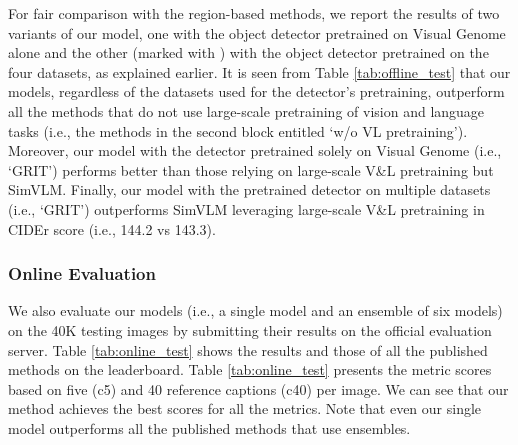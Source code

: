 \documentclass[runningheads]{llncs}
\begin{document}
For fair comparison with the region-based methods, we report the results of two variants of our model,  one with the object detector pretrained on Visual Genome alone and the other (marked with ) with the object detector pretrained on the four datasets, as explained earlier. 
It is seen from Table \ref{tab:offline_test} that our models, regardless of the datasets used for the detector's pretraining, outperform all the methods that do not use large-scale pretraining of vision and language tasks (i.e., the methods in the second block entitled `w/o VL pretraining'). Moreover, our model with the detector pretrained solely on Visual Genome (i.e., `GRIT') performs better than those relying on large-scale V\&L pretraining but SimVLM. Finally, our model with the pretrained detector on multiple datasets (i.e., `GRIT') outperforms SimVLM leveraging large-scale V\&L pretraining in CIDEr score (i.e., 144.2 vs 143.3). 

\subsubsection{Online Evaluation} 
We also evaluate our models (i.e., a single model and an ensemble of six models) on the 40K testing images by submitting their results on the official evaluation server. Table \ref{tab:online_test} shows the results and those of all the published methods on the leaderboard. Table \ref{tab:online_test} presents the metric scores based on five (c5) and 40 reference captions (c40) per image. We can see that our method achieves the best scores for all the metrics. Note that even our single model outperforms all the published methods that use ensembles.
\end{document}
